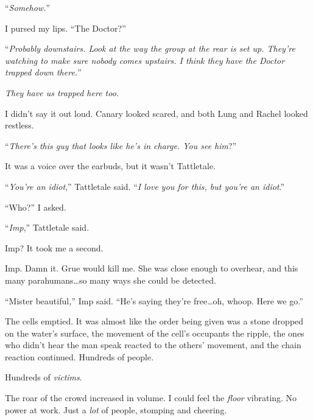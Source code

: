 ``\emph{Somehow.}''



I pursed my lips.  ``The Doctor?''



``\emph{Probably downstairs.  Look at the way the group at the rear is set up.  They're watching to make sure nobody comes upstairs.  I think they have the Doctor trapped down there.}''



\emph{They have us trapped here too.}



I didn't say it out loud.  Canary looked scared, and both Lung and Rachel looked restless.



``\emph{There's this guy that looks like he's in charge.  You see him}?''



It was a voice over the earbuds, but it wasn't Tattletale.



``\emph{You're an idiot},'' Tattletale said.  ``\emph{I love you for this, but you're an idiot}.''



``Who?''  I asked.



``\emph{Imp},'' Tattletale said.



Imp?  It took me a second.



Imp.  Damn it.  Grue would kill me.  She was close enough to overhear, and this many parahumans\ldots so many ways she could be detected.



``Mister beautiful\emph{,}'' Imp said.  ``He's saying they're free\ldots oh, whoop.  Here we go.''



The cells emptied.  It was almost like the order being given was a stone dropped on the water's surface, the movement of the cell's occupants the ripple, the ones who didn't hear the man speak reacted to the others' movement, and the chain reaction continued.  Hundreds of people.



Hundreds of \emph{victims}.



The roar of the crowd increased in volume.  I could feel the \emph{floor} vibrating.  No power at work.  Just a \emph{lot} of people, stomping and cheering.



